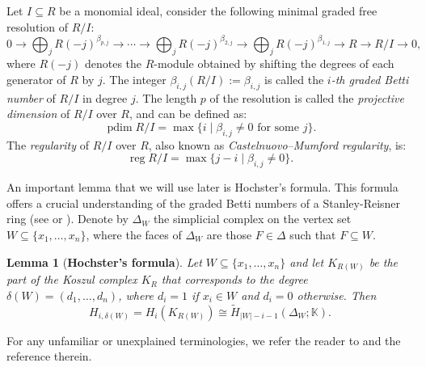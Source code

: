 \documentclass[a4paper,12pt]{amsart}
\numberwithin{equation}{section}
\newtheorem{lemma}[theorem]{Lemma}
\theoremstyle{definition}
\newcommand{\K}[0]{\mathbb{K}}
\DeclareMathOperator{\reg}{reg}
\DeclareMathOperator{\pdim}{pdim}
\begin{document}
Let $I\subseteq R$ be a monomial ideal, consider the following minimal graded free resolution of $R/I$:
$$0\longrightarrow\bigoplus_{j}R(-j)^{\beta_{p, j}}\longrightarrow\cdots\longrightarrow\bigoplus_{j}R(-j)^{\beta_{2, j}}\longrightarrow\bigoplus_{j}R(-j)^{\beta_{1, j}}\longrightarrow R\longrightarrow R/I\longrightarrow0,$$
where $R(-j)$ denotes the $R$-module obtained by shifting the degrees of each generator of $R$ by $j$. The integer $\beta_{i,j}(R/I):=\beta_{i,j}$ is called the \emph{$i$-th graded Betti number} of $R/I$ in degree $j$. The length $p$ of the resolution is called the \emph{projective dimension} of $R/I$ over $R$, and can be defined as:
$$\pdim R/I=\max\{i\mid\beta_{i,j}\neq 0\text{ for some }j\}.$$
The \emph{regularity} of $R/I$ over $R$, also known as \emph{Castelnuovo–Mumford regularity}, is:
$$\reg R/I=\max\{j-i\mid\beta_{i,j}\neq 0\}.$$



An important lemma that we will use later is Hochster's formula. This formula offers a crucial understanding of the graded Betti numbers of a Stanley-Reisner ring (see {\cite[Theorem 5.1]{Hochster1977}} or {\cite[Lemma 9]{Froberg2021}}). Denote by $\Delta_W$ the simplicial complex on the vertex set $W\subseteq\{x_1,\ldots,x_n\}$, where the faces of $\Delta_W$ are those $F\in\Delta$ such that $F\subseteq W$.

\begin{lemma}[\textbf{Hochster's formula}]\label{hochster}
	Let $W\subseteq\{x_1,\ldots,x_n\}$ and let $K_{R(W)}$ be the part of the Koszul complex $K_R$ that corresponds to the degree $\delta(W)=(d_1,\ldots,d_n)$, where $d_i=1$ if $x_i\in W$ and $d_i=0$ otherwise. Then 
	$$H_{i,\delta(W)}=H_i(K_{R(W)})\cong\tilde{H}_{|W|-i-1}(\Delta_W;\K).$$
\end{lemma}

For any unfamiliar or unexplained terminologies, we refer the reader to \cite{BrunsHerzog1998,Eisenbud1995, Villarreal2015} and the reference therein.
\end{document}

